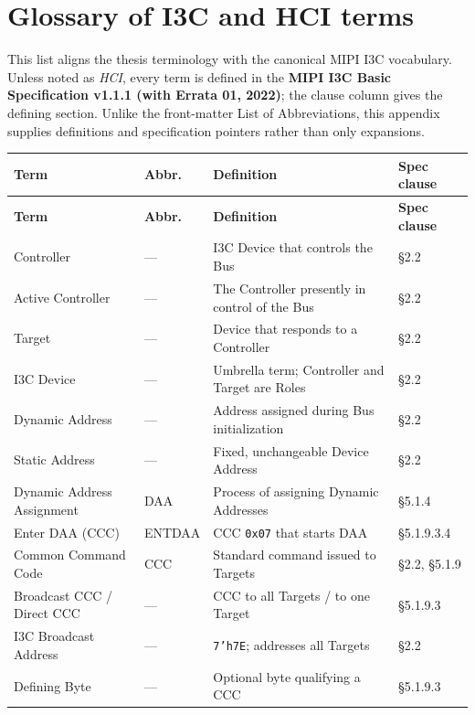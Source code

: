 \chapter{Glossary of I3C and HCI terms}
\label{app:glossary}

This list aligns the thesis terminology with the canonical MIPI I3C vocabulary. Unless noted as
\emph{HCI}, every term is defined in the \textbf{MIPI I3C Basic Specification v1.1.1 (with Errata 01,
2022)}; the clause column gives the defining section. Unlike the front-matter List of
Abbreviations, this appendix supplies definitions and specification pointers rather than only expansions.

{\footnotesize
\begin{longtable}{@{}>{\raggedright\arraybackslash}p{3.0cm}
                    >{\raggedright\arraybackslash}p{1.5cm}
                    >{\raggedright\arraybackslash}p{6.1cm}
                    >{\raggedright\arraybackslash}p{2.5cm}@{}}
\toprule
\textbf{Term} & \textbf{Abbr.} & \textbf{Definition} & \textbf{Spec clause} \\
\midrule
\endfirsthead
\toprule
\textbf{Term} & \textbf{Abbr.} & \textbf{Definition} & \textbf{Spec clause} \\
\midrule
\endhead
\bottomrule
\endfoot
Controller & --- & I3C Device that controls the Bus & \S2.2 \\
Active Controller & --- & The Controller presently in control of the Bus & \S2.2 \\
Target & --- & Device that responds to a Controller & \S2.2 \\
I3C Device & --- & Umbrella term; Controller and Target are Roles & \S2.2 \\
Dynamic Address & --- & Address assigned during Bus initialization & \S2.2 \\
Static Address & --- & Fixed, unchangeable Device Address & \S2.2 \\
Dynamic Address Assignment & DAA & Process of assigning Dynamic Addresses & \S5.1.4 \\
Enter DAA (CCC) & ENTDAA & CCC \texttt{0x07} that starts DAA & \S5.1.9.3.4 \\
Common Command Code & CCC & Standard command issued to Targets & \S2.2, \S5.1.9 \\
Broadcast CCC / Direct CCC & --- & CCC to all Targets / to one Target & \S5.1.9.3 \\
I3C Broadcast Address & --- & \texttt{7'h7E}; addresses all Targets & \S2.2 \\
Defining Byte & --- & Optional byte qualifying a CCC & \S5.1.9.3 \\

\end{longtable}}
